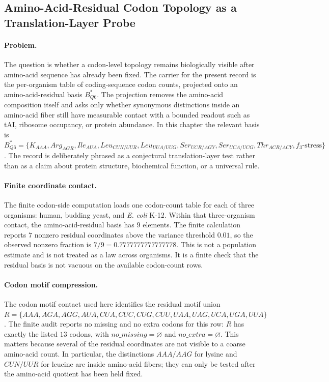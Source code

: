 \subsection{Amino-Acid-Residual Codon Topology as a Translation-Layer Probe}
\label{sec:bior-residual-basis-q6-translation-realization}

\paragraph{Problem.}
The question is whether a codon-level topology remains biologically visible after amino-acid sequence has already been fixed. The carrier for the present record is the per-organism table of coding-sequence codon counts, projected onto an amino-acid-residual basis $B^{\ast}_{Q6}$. The projection removes the amino-acid composition itself and asks only whether synonymous distinctions inside an amino-acid fiber still have measurable contact with a bounded readout such as tAI, ribosome occupancy, or protein abundance. In this chapter the relevant basis is
$B^{\ast}_{Q6}=\{K_{AAA}, Arg_{AGR}, Ile_{AUA}, Leu_{CUN/UUR}, Leu_{UUA/UUG}, Ser_{UCR/AGY}, Ser_{UCA/UCG}, Thr_{ACR/ACY}, f_3\text{-stress}\}$.
The record is deliberately phrased as a conjectural translation-layer test rather than as a claim about protein structure, biochemical function, or a universal rule.

\paragraph{Finite coordinate contact.}
The finite codon-side computation loads one codon-count table for each of three organisms: human, budding yeast, and \emph{E. coli} K-12. Within that three-organism contact, the amino-acid-residual basis has $9$ elements. The finite calculation reports $7$ nonzero residual coordinates above the variance threshold $0.01$, so the observed nonzero fraction is $7/9=0.7777777777777778$. This is not a population estimate and is not treated as a law across organisms. It is a finite check that the residual basis is not vacuous on the available codon-count rows.

\paragraph{Codon motif compression.}
The codon motif contact used here identifies the residual motif union
$R=\{AAA, AGA, AGG, AUA, CUA, CUC, CUG, CUU, UAA, UAG, UCA, UGA, UUA\}$.
The finite audit reports no missing and no extra codons for this row: $R$ has exactly the listed $13$ codons, with $no\_missing=\varnothing$ and $no\_extra=\varnothing$. This matters because several of the residual coordinates are not visible to a coarse amino-acid count. In particular, the distinctions $AAA/AAG$ for lysine and $CUN/UUR$ for leucine are inside amino-acid fibers; they can only be tested after the amino-acid quotient has been held fixed.


